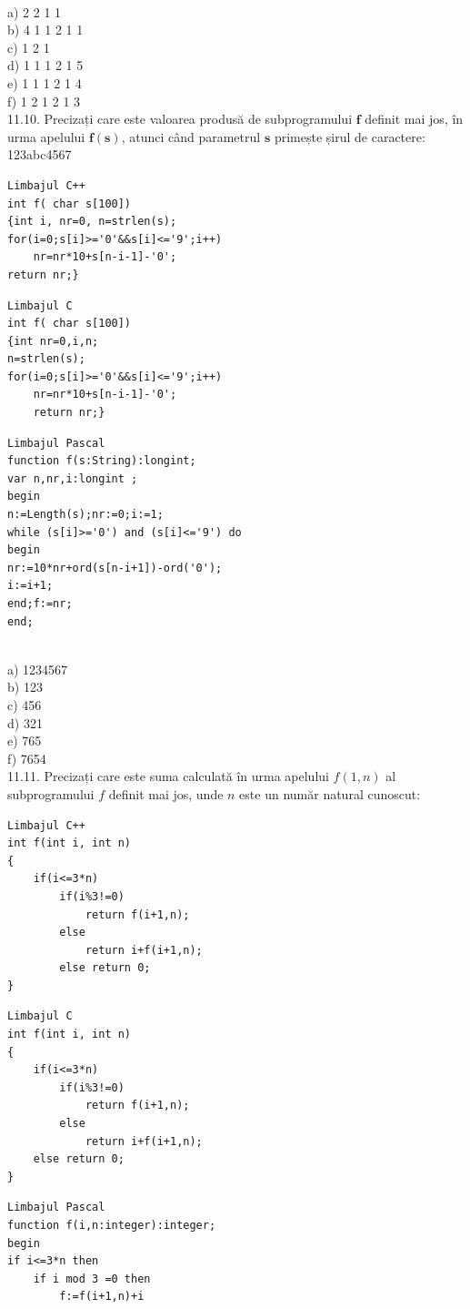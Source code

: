 {\\
a) 2 2 1 1
\\
b) 4 1 1 2 1 1
\\
c) 1 2 1
\\
d) 1 1 1 2 1 5
\\
e) 1 1 1 2 1 4
\\
f) 1 2 1 2 1 3
\\
11.10. Precizați care este valoarea produsă de subprogramului $\mathbf{f}$ definit mai jos, în urma apelului $\mathbf{f ( s )}$, atunci când parametrul $\mathbf{s}$ primește șirul de caractere: 123abc4567
\begin{verbatim}
Limbajul C++
int f( char s[100])
{int i, nr=0, n=strlen(s);
for(i=0;s[i]>='0'&&s[i]<='9';i++)
    nr=nr*10+s[n-i-1]-'0';
return nr;}
\end{verbatim}
\begin{verbatim}
Limbajul C
int f( char s[100])
{int nr=0,i,n;
n=strlen(s);
for(i=0;s[i]>='0'&&s[i]<='9';i++)
    nr=nr*10+s[n-i-1]-'0';
    return nr;}
\end{verbatim}
\begin{verbatim}
Limbajul Pascal
function f(s:String):longint;
var n,nr,i:longint ;
begin
n:=Length(s);nr:=0;i:=1;
while (s[i]>='0') and (s[i]<='9') do
begin
nr:=10*nr+ord(s[n-i+1])-ord('0');
i:=i+1;
end;f:=nr;
end;
\end{verbatim}
\\
a) 1234567
\\
b) 123
\\
c) 456
\\
d) 321
\\
e) 765
\\
f) 7654
\\
11.11. Precizați care este suma calculată în urma apelului $f(1, n)$ al subprogramului $f$ definit mai jos, unde $n$ este un număr natural cunoscut:
\begin{verbatim}
Limbajul C++
int f(int i, int n)
{
    if(i<=3*n)
        if(i%3!=0)
            return f(i+1,n);
        else
            return i+f(i+1,n);
        else return 0;
}
\end{verbatim}
\begin{verbatim}
Limbajul C
int f(int i, int n)
{
    if(i<=3*n)
        if(i%3!=0)
            return f(i+1,n);
        else
            return i+f(i+1,n);
    else return 0;
}
\end{verbatim}
\begin{verbatim}
Limbajul Pascal
function f(i,n:integer):integer;
begin
if i<=3*n then
    if i mod 3 =0 then
        f:=f(i+1,n)+i

\end{verbatim}}
